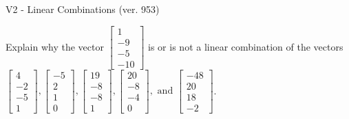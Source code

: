 \begin{exercise}
  \begin{exerciseTitle}V2 - Linear Combinations (ver. 953)\end{exerciseTitle}
  \begin{exerciseStatement}
    Explain why the vector \(\left[\begin{array}{c}
1 \\
-9 \\
-5 \\
-10
\end{array}\right]\)  is or is not a linear 
	combination of the vectors \(\left[\begin{array}{c}
4 \\
-2 \\
-5 \\
1
\end{array}\right] , \left[\begin{array}{c}
-5 \\
2 \\
1 \\
0
\end{array}\right] , \left[\begin{array}{c}
19 \\
-8 \\
-8 \\
1
\end{array}\right] , \left[\begin{array}{c}
20 \\
-8 \\
-4 \\
0
\end{array}\right] , \text{ and } \left[\begin{array}{c}
-48 \\
20 \\
18 \\
-2
\end{array}\right]\).
	



\end{exerciseStatement}
\end{exercise}
